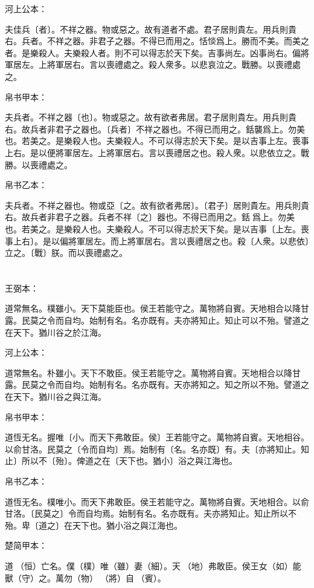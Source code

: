 \documentclass[a5paper]{ctexbook}
\begin{document}
    河上公本：

    夫佳兵〔者〕。不祥之器。物或惡之。故有道者不處。君子居則貴左。用兵則貴右。兵者。不祥之器。非君子之器。不得已而用之。恬惔爲上。勝而不美。而美之者。是樂殺人。夫樂殺人者。則不可以得志於天下矣。吉事尚左。凶事尚右。偏將軍居左。上將軍居右。言以喪禮處之。殺人衆多。以悲哀泣之。戰勝。以喪禮處之。

    帛书甲本：

    夫兵者。不祥之器〔也〕。物或惡之。故有欲者弗居。君子居則貴左。用兵則貴右。故兵者非君子之器也。〔兵者〕不祥之器也。不得已而用之。銛襲爲上。勿美也。若美之。是樂殺人也。夫樂殺人。不可以得志於天下矣。是以吉事上左。喪事上右。是以便將軍居左。上將軍居右。言以喪禮居之也。殺人衆。以悲依立之。戰勝。以喪禮處之。

    帛书乙本：

    夫兵者。不祥之器也。物或亞〔之。故有欲者弗居〕。〔君子〕居則貴左。用兵則貴右。故兵者非君子之器。兵者不祥〔之〕器也。不得已而用之。銛𢤱爲上。勿美也。若美之。是樂殺人也。夫樂殺人。不可以得志於天下矣。是以吉事〔上左。喪事上右〕。是以偏將軍居左。而上將軍居右。言以喪禮居之也。殺〔人衆。以悲依〕立之。〔戰〕朕。而以喪禮處之。

    \chapter{}
    王弼本：

    道常無名。樸雖小。天下莫能臣也。侯王若能守之。萬物將自賓。天地相合以降甘露。民莫之令而自均。始制有名。名亦既有。夫亦將知止。知止可以不殆。譬道之在天下。猶川谷之於江海。

    河上公本：

    道常無名。朴雖小。天下不敢臣。侯王若能守之。萬物將自賓。天地相合以降甘露。民莫之令而自均。始制有名。名亦既有。天亦將知之。知之所以不殆。譬道之在天下。猶川谷之與江海。

    帛书甲本：

    道恆无名。握唯〔小。而天下弗敢臣。侯〕王若能守之。萬物將自賓。天地相谷。以俞甘洛。民莫之〔令而自均〕焉。始制有〔名。名亦既〕有。夫〔亦將知止。知止〕所以不〔殆〕。俾道之在〔天下也。猶小〕浴之與江海也。

    帛书乙本：

    道恆无名。樸唯小。而天下弗敢臣。侯王若能守之。萬物將自賓。天地相合。以俞甘洛。〔民莫之〕令而自均焉。始制有名。名亦既有。夫亦將知止。知止所以不殆。卑〔道之〕在天下也。猶小浴之與江海也。

    楚简甲本：

    道𠄨（恒）亡名。僕（樸）唯（雖）妻（細）。天󶴵（地）弗敢臣。侯王女（如）能獸（守）之。萬勿（物）𨟻（將）自󵦐（賓）。
\end{document}
